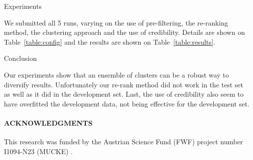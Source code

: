 \documentclass{acm_proc_article-me}
\begin{document}
\begin{section}{Experiments}

We submitted all 5 runs, varying on the use of pre-filtering, the re-ranking method, the clustering approach and the use of credibility.
Details are shown on Table~\ref{table:config} and the results are shown on Table~\ref{table:results}.

%
%
\end{section}
\begin{section}{Conclusion}

Our experiments show that an ensemble of clusters can be a robust way to diversify results.
Unfortunately our re-rank method did not work in the test set as well as it did in the development set.
Last, the use of credibility also seem to have overfitted the development data, not being effective for the development set.

\end{section}

\paragraph{\textbf{ACKNOWLEDGMENTS}}
This research was funded by the Austrian Science Fund (FWF) project number I1094-N23 (MUCKE) .


  
\end{document}
